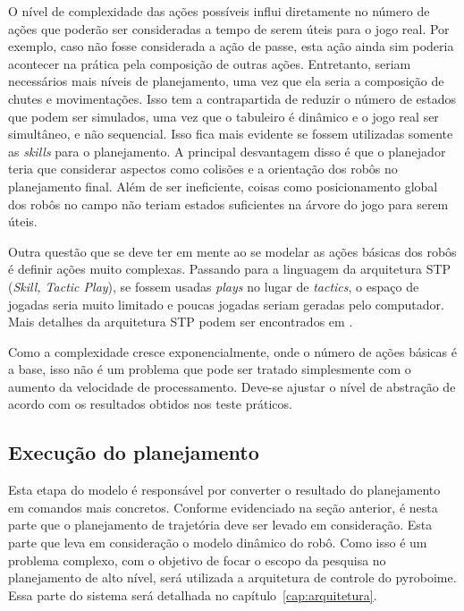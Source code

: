 O nível de complexidade das ações possíveis influi diretamente no número de
ações que poderão ser consideradas a tempo de serem úteis para o jogo real. Por
exemplo, caso não fosse considerada a ação de passe, esta ação ainda sim poderia
acontecer na prática pela composição de outras ações. Entretanto, seriam
necessários mais níveis de planejamento, uma vez que ela seria a composição de
chutes e movimentações. Isso tem a contrapartida de reduzir o número de estados
que podem ser simulados, uma vez que o tabuleiro é dinâmico e o jogo real ser
simultâneo, e não sequencial. Isso fica mais evidente se fossem utilizadas
somente as \textit{skills} para o planejamento. A principal desvantagem disso
é que o planejador teria que considerar aspectos como colisões e a orientação
dos robôs no planejamento final. Além de ser ineficiente, coisas como
posicionamento global dos robôs no campo não teriam estados suficientes na
árvore do jogo para serem úteis.

Outra questão que se deve ter em mente ao se modelar as ações básicas dos robôs
é definir ações muito complexas. Passando para a linguagem da arquitetura STP
(\textit{Skill, Tactic Play}), se fossem usadas \textit{plays} no lugar de
\textit{tactics}, o espaço de jogadas seria muito limitado e poucas jogadas
seriam geradas pelo computador. Mais detalhes da arquitetura STP podem ser
encontrados em \cite{browning2004stp}.

Como a complexidade cresce exponencialmente, onde o número de ações básicas é
a base, isso não é um problema que pode ser tratado simplesmente com o aumento
da velocidade de processamento. Deve-se ajustar o nível de abstração de acordo
com os resultados obtidos nos teste práticos.

\subsection{Execução do planejamento}

Esta etapa do modelo é responsável por converter o resultado do planejamento em
comandos mais concretos. Conforme evidenciado na seção anterior, é nesta parte
que o planejamento de trajetória deve ser levado em consideração. Esta parte que
leva em consideração o modelo dinâmico do robô.
Como isso é um problema complexo, com o objetivo de focar o escopo da pesquisa
no planejamento de alto nível, será utilizada a arquitetura de controle do
pyroboime. Essa parte do sistema será detalhada no capítulo~\ref{cap:arquitetura}.

